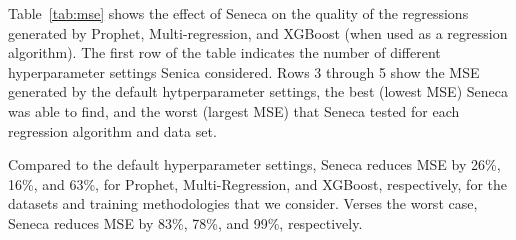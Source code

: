 Table~\ref{tab:mse} shows the effect of Seneca on the quality of the
regressions generated by Prophet, Multi-regression, and XGBoost (when used as
a regression algorithm). The first row of the table indicates the number of
different hyperparameter settings Senica considered.  Rows 3 through 5 show
the MSE generated by the default hytperparameter settings, the best (lowest
MSE) Seneca was able to find, and the worst (largest MSE) that Seneca tested
for each regression algorithm and data set.

%

Compared to the default hyperparameter settings,
Seneca reduces MSE by 26\%, 16\%, and 63\%, for Prophet, Multi-Regression, and XGBoost,
respectively, for the datasets and training methodologies that we consider.
Verses the worst case, Seneca reduces MSE by 83\%, 78\%, and 99\%, respectively.

